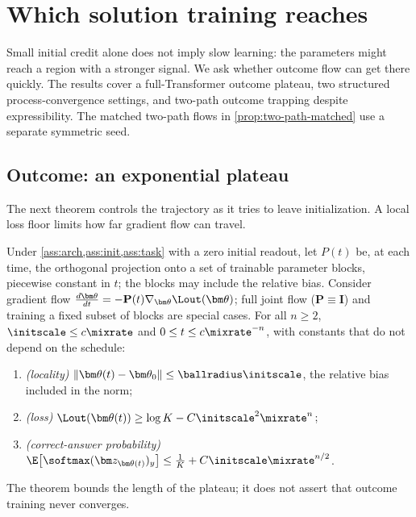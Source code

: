 \section{Which solution training reaches}
\label{sec:reach}

Small initial credit alone does not imply slow learning: the parameters might reach a region with a stronger signal. We ask
whether outcome flow can get there quickly. The results cover a full-Transformer outcome plateau,
two structured process-convergence settings, and two-path outcome trapping despite
expressibility. The matched two-path flows in \cref{prop:two-path-matched} use a separate
symmetric seed.

\subsection{Outcome: an exponential plateau}

The next theorem controls the trajectory as it tries to leave initialization. A local loss floor limits how far gradient flow can travel.

\begin{theorem}
\label{thm:outcome-end}
Under \cref{ass:arch,ass:init,ass:task} with a zero initial readout, let $P(t)$ be, at each time, the orthogonal projection onto a set
of trainable parameter blocks, piecewise constant in $t$; the blocks may include the relative bias. Consider gradient flow
$\tfrac{d\bm\theta}{dt}=-\mathbf P(t)\nabla_{\bm\theta}\Lout(\bm\theta)$; full joint flow ($\mathbf P\equiv\mathbf I$) and training a fixed subset of blocks are special cases.
For all $n\ge2$, $\initscale\le c\mixrate$ and $0\le t\le c\mixrate^{-n}$, with constants that do not depend on the schedule:
\begin{enumerate}[label=(\roman*),leftmargin=*,itemsep=0pt,topsep=2pt]
\item \emph{(locality)} $\|\bm\theta(t)-\bm\theta_0\|\le\ballradius\initscale$, the relative bias included in the norm;
\item \emph{(loss)} $\Lout(\bm\theta(t))\ge\log K-C\initscale^2\mixrate^n$;
\item \emph{(correct-answer probability)} $\E\bigl[\softmax(\bm z_{\bm\theta(t)})_y\bigr]\le\frac{1}{K}+C\initscale\mixrate^{n/2}$.
\end{enumerate}
\end{theorem}
The theorem bounds the length of the plateau; it does not assert that outcome training never converges.

